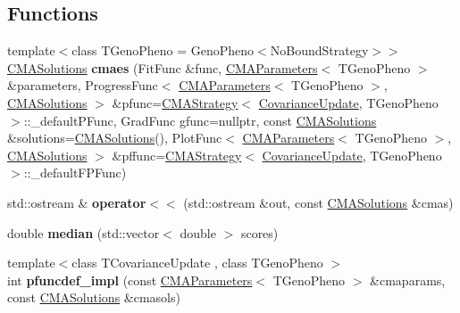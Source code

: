 \subsection*{Functions}
\begin{DoxyCompactItemize}
\item 
\hypertarget{namespacelibcmaes_ac383e38be3f6670eddeec0918d385bd6}{{\footnotesize template$<$class T\+Geno\+Pheno  = Geno\+Pheno$<$\+No\+Bound\+Strategy$>$$>$ }\\\hyperlink{classlibcmaes_1_1CMASolutions}{C\+M\+A\+Solutions} {\bfseries cmaes} (Fit\+Func \&func, \hyperlink{classlibcmaes_1_1CMAParameters}{C\+M\+A\+Parameters}$<$ T\+Geno\+Pheno $>$ \&parameters, Progress\+Func$<$ \hyperlink{classlibcmaes_1_1CMAParameters}{C\+M\+A\+Parameters}$<$ T\+Geno\+Pheno $>$, \hyperlink{classlibcmaes_1_1CMASolutions}{C\+M\+A\+Solutions} $>$ \&pfunc=\hyperlink{classlibcmaes_1_1CMAStrategy}{C\+M\+A\+Strategy}$<$ \hyperlink{classlibcmaes_1_1CovarianceUpdate}{Covariance\+Update}, T\+Geno\+Pheno $>$\+::\+\_\+default\+P\+Func, Grad\+Func gfunc=nullptr, const \hyperlink{classlibcmaes_1_1CMASolutions}{C\+M\+A\+Solutions} \&solutions=\hyperlink{classlibcmaes_1_1CMASolutions}{C\+M\+A\+Solutions}(), Plot\+Func$<$ \hyperlink{classlibcmaes_1_1CMAParameters}{C\+M\+A\+Parameters}$<$ T\+Geno\+Pheno $>$, \hyperlink{classlibcmaes_1_1CMASolutions}{C\+M\+A\+Solutions} $>$ \&pffunc=\hyperlink{classlibcmaes_1_1CMAStrategy}{C\+M\+A\+Strategy}$<$ \hyperlink{classlibcmaes_1_1CovarianceUpdate}{Covariance\+Update}, T\+Geno\+Pheno $>$\+::\+\_\+default\+F\+P\+Func)}\label{namespacelibcmaes_ac383e38be3f6670eddeec0918d385bd6}

\item 
\hypertarget{namespacelibcmaes_a1922020e8d2259dd870ccd7893c3ea24}{std\+::ostream \& {\bfseries operator$<$$<$} (std\+::ostream \&out, const \hyperlink{classlibcmaes_1_1CMASolutions}{C\+M\+A\+Solutions} \&cmas)}\label{namespacelibcmaes_a1922020e8d2259dd870ccd7893c3ea24}

\item 
\hypertarget{namespacelibcmaes_a5b344b982de59b91af2f0c317f234f17}{double {\bfseries median} (std\+::vector$<$ double $>$ scores)}\label{namespacelibcmaes_a5b344b982de59b91af2f0c317f234f17}

\item 
\hypertarget{namespacelibcmaes_a25ea885e651e76d1f0496610a28be7b2}{{\footnotesize template$<$class T\+Covariance\+Update , class T\+Geno\+Pheno $>$ }\\int {\bfseries pfuncdef\+\_\+impl} (const \hyperlink{classlibcmaes_1_1CMAParameters}{C\+M\+A\+Parameters}$<$ T\+Geno\+Pheno $>$ \&cmaparams, const \hyperlink{classlibcmaes_1_1CMASolutions}{C\+M\+A\+Solutions} \&cmasols)}\label{namespacelibcmaes_a25ea885e651e76d1f0496610a28be7b2}


\end{DoxyCompactItemize}

